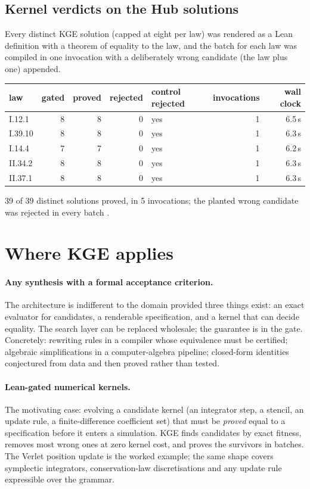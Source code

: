 \documentclass[11pt,a4paper]{article}
\theoremstyle{definition}
\theoremstyle{remark}
\begin{document}
\subsection{Kernel verdicts on the Hub solutions}\label{sec:hubgate}

Every distinct KGE solution (capped at eight per law) was rendered as a Lean definition with a theorem of equality to the law, and the batch for each law was compiled in one invocation with a deliberately wrong candidate (the law plus one) appended.

\begin{center}
\begin{tabular}{lrrrlrr}
\toprule
law & gated & proved & rejected & control rejected & invocations & wall clock \\
\midrule
I.12.1 & 8 & 8 & 0 & yes & 1 & 6.5\,s \\
I.39.10 & 8 & 8 & 0 & yes & 1 & 6.3\,s \\
I.14.4 & 7 & 7 & 0 & yes & 1 & 6.2\,s \\
II.34.2 & 8 & 8 & 0 & yes & 1 & 6.3\,s \\
II.37.1 & 8 & 8 & 0 & yes & 1 & 6.3\,s \\
\bottomrule
\end{tabular}
\end{center}

39 of 39 distinct solutions proved, in 5 invocations; the planted wrong candidate was rejected in every batch .

\section{Where KGE applies}\label{sec:applies}

\paragraph{Any synthesis with a formal acceptance criterion.} The architecture is
indifferent to the domain provided three things exist: an exact evaluator for
candidates, a renderable specification, and a kernel that can decide equality.
The search layer can be replaced wholesale; the guarantee is in the gate.
Concretely: rewriting rules in a compiler whose equivalence must be certified;
algebraic simplifications in a computer-algebra pipeline; closed-form identities
conjectured from data and then proved rather than tested.

\paragraph{Lean-gated numerical kernels.} The motivating case: evolving a
candidate kernel (an integrator step, a stencil, an update rule, a
finite-difference coefficient set) that must be \emph{proved} equal to a
specification before it enters a simulation. KGE finds candidates by exact
fitness, removes most wrong ones at zero kernel cost, and proves the survivors in
batches. The Verlet position update is the worked example; the same shape covers
symplectic integrators, conservation-law discretisations and any update rule
expressible over the grammar.
\end{document}
